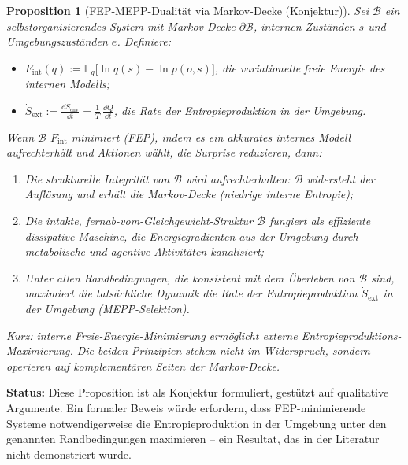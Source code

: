 \documentclass[12pt,a4paper]{article}
\newtheorem{proposition}{Proposition}
\theoremstyle{remark}
\begin{document}
\begin{proposition}[FEP-MEPP-Dualit\"at via Markov-Decke (Konjektur)]
\label{prop:fep-mepp}
Sei $\mathcal{B}$ ein selbstorganisierendes System mit Markov-Decke $\partial\mathcal{B}$, internen Zust\"anden $s$ und Umgebungszust\"anden $e$. Definiere:
\begin{itemize}
  \item $F_{\mathrm{int}}(q) :=
    \mathbb{E}_{q}\!\bigl[\ln q(s) - \ln p(o, s)\bigr]$,
    die variationelle freie Energie des internen Modells;
  \item $\dot{S}_{\mathrm{ext}} :=
    \frac{\dd S_{\mathrm{env}}}{\dd t} =
    \frac{1}{T}\,\frac{\dd Q}{\dd t}$,
    die Rate der Entropieproduktion in der Umgebung.
\end{itemize}
Wenn $\mathcal{B}$ $F_{\mathrm{int}}$ minimiert (FEP), indem es ein akkurates internes Modell aufrechterh\"alt und Aktionen w\"ahlt, die Surprise reduzieren, dann:
\begin{enumerate}
  \item[\emph{(i)}] Die strukturelle Integrit\"at von $\mathcal{B}$ wird aufrechterhalten: $\mathcal{B}$ widersteht der Aufl\"osung und erh\"alt die Markov-Decke (niedrige interne Entropie);
  \item[\emph{(ii)}] Die intakte, fernab-vom-Gleichgewicht-Struktur $\mathcal{B}$ fungiert als effiziente dissipative Maschine, die Energiegradienten aus der Umgebung durch metabolische und agentive Aktivit\"aten kanalisiert;
  \item[\emph{(iii)}] Unter allen Randbedingungen, die konsistent mit dem \"Uberleben von $\mathcal{B}$ sind, maximiert die tats\"achliche Dynamik die Rate der Entropieproduktion $\dot{S}_{\mathrm{ext}}$ in der Umgebung (MEPP-Selektion).
\end{enumerate}
Kurz: \emph{interne Freie-Energie-Minimierung erm\"oglicht externe Entropieproduktions-Maximierung}. Die beiden Prinzipien stehen nicht im Widerspruch, sondern operieren auf komplement\"aren Seiten der Markov-Decke.
\end{proposition}

\noindent\textbf{Status:} Diese Proposition ist als Konjektur formuliert, gest\"utzt auf qualitative Argumente. Ein formaler Beweis w\"urde erfordern, dass FEP-minimierende Systeme notwendigerweise die Entropieproduktion in der Umgebung unter den genannten Randbedingungen maximieren -- ein Resultat, das in der Literatur nicht demonstriert wurde.
\end{document}
